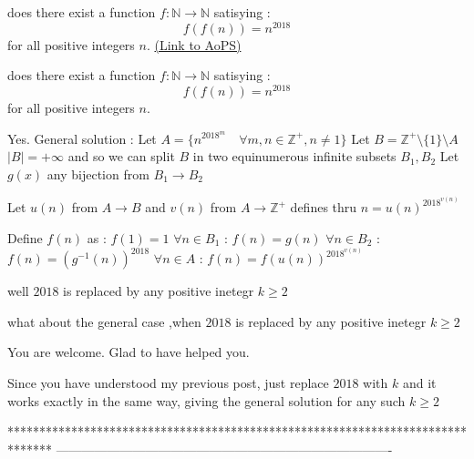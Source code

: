 \begin{problem}
	does there exist a function $f : \mathbb{N} \rightarrow \mathbb{N}$ satisying :
$$f(f(n))=n^{2018}$$ for all positive integers $n$.
	\flushright \href{https://artofproblemsolving.com/community/c6h1618771}{(Link to AoPS)}
\end{problem}



\begin{solution}
	\begin{tcolorbox}does there exist a function $f : \mathbb{N} \rightarrow \mathbb{N}$ satisying :
$$f(f(n))=n^{2018}$$ for all positive integers $n$.\end{tcolorbox}
Yes. General solution :
Let $A=\{n^{2018^m}\quad\forall m,n\in\mathbb Z^+, n\ne 1\}$
Let $B=\mathbb Z^+\setminus\{1\}\setminus A$
$|B|=+\infty$ and so we can split $B$ in two equinumerous infinite subsets $B_1,B_2$
Let $g(x)$ any bijection from $B_1\to B_2$

Let $u(n)$ from $A\to B$ and $v(n)$ from $A\to\mathbb Z^+$ defines thru
$n=u(n)^{2018^{v(n)}}$

Define $f(n)$ as :
$f(1)=1$
$\forall n\in B_1$ : $f(n)=g(n)$
$\forall n\in B_2$ : $f(n)=(g^{-1}(n))^{2018}$
$\forall n\in A$ : $f(n)=f(u(n))^{2018^{v(n)}}$

\end{solution}



\begin{solution}
	well $2018$ is replaced by any positive inetegr $k \geq 2$
\end{solution}



\begin{solution}
	\begin{tcolorbox}what about the general case ,when $2018$ is replaced by any positive inetegr $k \geq 2$\end{tcolorbox}
You are welcome. Glad to have helped you.

Since you have understood my previous post, just replace $2018$ with $k$ and it works exactly in the same way, giving the general solution for any such $k\ge 2$


\end{solution}
*******************************************************************************
-------------------------------------------------------------------------------

